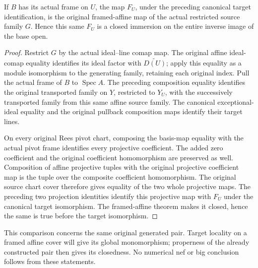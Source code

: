 \begin{lemma}
\label{lem:kn-nadel-nef-big-base-open-same-framed-map}
\notready
{}
If $B$ has its actual frame on $U$, the map $F_U$, under the preceding
canonical target identification, is the original framed-affine map of
the actual restricted source family $G$.  Hence this same $F_U$ is a
closed immersion on the entire inverse image of the base open.
\end{lemma}
\begin{proof}
Restrict $G$ by the actual ideal--line comap map.  The original affine
ideal-comap equality identifies its ideal factor with $\widetilde{D(U)}$;
apply this equality as a module isomorphism to the generating family,
retaining each original index.  Pull the actual frame of $B$ to
$\operatorname{Spec}A$.  The preceding composition equality identifies
the original transported family on $Y$, restricted to $Y_U$, with the
successively transported family from this same affine source family.
The canonical exceptional-ideal equality and the original pullback
composition maps identify their target lines.

On every original Rees pivot chart, composing the basis-map equality
with the actual pivot frame identifies every projective coefficient.
The added zero coefficient and the original coefficient homomorphism
are preserved as well.  Composition of affine projective tuples with
the original projective coefficient map is the tuple over the composite
coefficient homomorphism.  The original source chart cover therefore
gives equality of the two whole projective maps.  The preceding two
projection identities identify this projective map with $F_U$ under
the canonical target isomorphism.  The framed-affine theorem makes it
closed, hence the same is true before the target isomorphism.
\end{proof}

This comparison concerns the same original generated pair.  Target
locality on a framed affine cover will give its global monomorphism;
properness of the already constructed pair then gives its closedness.
No numerical nef or big conclusion follows from these statements.
